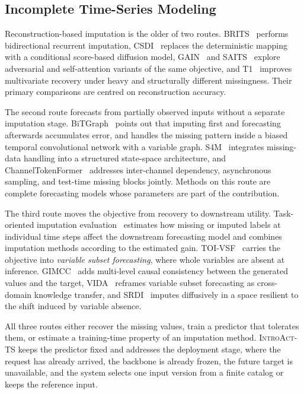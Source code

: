 \documentclass{article}
\newcommand{\introact}{\textsc{IntroAct-TS}}
\begin{document}
\subsection{Incomplete Time-Series Modeling}
\label{sec:related-incomplete}
Reconstruction-based imputation is the older of two routes. BRITS~\citep{cao2018brits}
performs bidirectional recurrent imputation, CSDI~\citep{tashiro2021csdi} replaces the
deterministic mapping with a conditional score-based diffusion model,
GAIN~\citep{yoon2018gain} and SAITS~\citep{du2023saits} explore adversarial and self-attention
variants of the same objective, and T1~\citep{park2026t1} improves multivariate recovery under
heavy and structurally different missingness. Their primary comparisons are centred on
reconstruction accuracy.

The second route forecasts from partially observed inputs without a separate imputation stage.
BiTGraph~\citep{chen2024bitgraph} points out that imputing first and forecasting afterwards
accumulates error, and handles the missing pattern inside a biased temporal convolutional
network with a variable graph. S4M~\citep{peng2025s4m} integrates missing-data handling into a
structured state-space architecture, and ChannelTokenFormer~\citep{jang2026channeltokenformer}
addresses inter-channel dependency, asynchronous sampling, and test-time missing blocks
jointly. Methods on this route are complete forecasting models whose parameters are part of the
contribution.

The third route moves the objective from recovery to downstream utility. Task-oriented
imputation evaluation~\citep{wang2024taskoriented} estimates how missing or imputed labels at
individual time steps affect the downstream forecasting model and combines imputation methods
according to the estimated gain. TOI-VSF~\citep{hao2025toivsf} carries the objective into
\emph{variable subset forecasting}, where whole variables are absent at inference.
GIMCC~\citep{hao2025gimcc} adds multi-level causal consistency between the generated values and
the target, VIDA~\citep{liang2025vida} reframes variable subset forecasting as cross-domain
knowledge transfer, and SRDI~\citep{xu2026srdi} imputes diffusively in a space resilient to the
shift induced by variable absence.

All three routes either recover the missing values, train a predictor that tolerates them, or
estimate a training-time property of an imputation method. \introact{} keeps the predictor
fixed and addresses the deployment stage, where the request has already arrived, the backbone
is already frozen, the future target is unavailable, and the system selects one input version
from a finite catalog or keeps the reference input.
\end{document}
